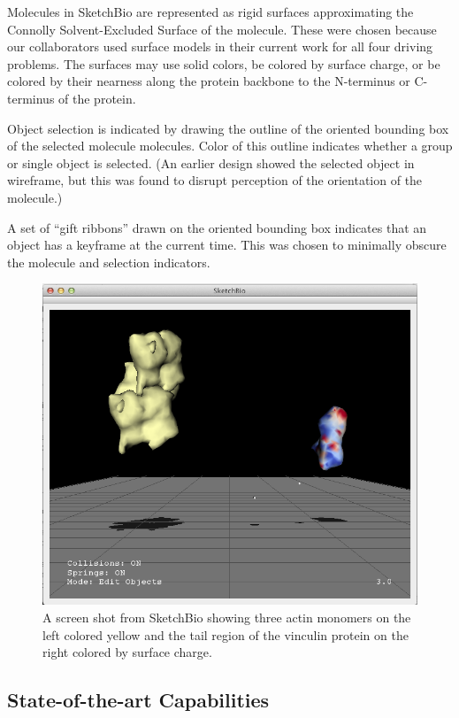 \documentclass[twocolumn]{bmcart}%
\begin{document}
Molecules in SketchBio are represented as rigid surfaces approximating the Connolly Solvent-Excluded Surface of the molecule.
These were chosen because our collaborators used surface models in their current work for all four driving problems.  The surfaces may use solid colors, be colored by surface charge, or be colored by their nearness along the protein backbone to the N-terminus or C-terminus of the protein.

Object selection is indicated by drawing the outline of the oriented bounding box of the selected molecule molecules. 
Color of this outline indicates whether a group or single object is selected.
(An earlier design showed the selected object in wireframe, but this was found to disrupt perception of the orientation of the molecule.)

A set of ``gift ribbons'' drawn on the oriented bounding box indicates that an object has a keyframe at the current time.
This was chosen to minimally obscure the molecule and selection indicators.

\begin{figure}[ht]
\centering
\includegraphics[width=0.9\columnwidth]{actinVinculin.png}
\caption{A screen shot from SketchBio showing three actin monomers on the left colored yellow and the tail region of the vinculin protein on the right colored by surface charge.}
\label{fig:actin_vinculin}
\end{figure}

\subsection*{State-of-the-art Capabilities}
\end{document}
